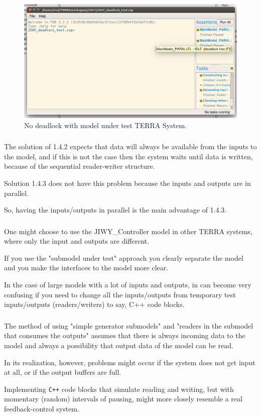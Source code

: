 \documentclass[a4paper,twoside,11pt]{article}
\newcommand{\cpp}{{\tt C++} }
\begin{document}
\begin{figure}
	\centering
	\includegraphics[width=\textwidth]{./images/4-4_fdr.png}
	\caption{No deadlock with model under test TERRA System.}
	\label{fig:4_4_fdr}
\end{figure}

\subsubsection{}
The solution of 1.4.2 expects that data will always be available from the inputs 
to the model, and if this is not the case then the system waits until data is written, 
because of the sequential reader-writer structure.

Solution 1.4.3 does not have this problem because the inputs and outputs are in parallel.

So, having the inputs/outputs in parallel is the main advantage of 1.4.3.

\subsubsection{}
One might choose to use the JIWY\_Controller model in other TERRA systems, where only the input and outputs are different.

If you use the "submodel under test" approach you clearly separate the model and you make the interfaces to the model more clear.

In the case of large models with a lot of inputs and outputs, in can become very confusing if you need to change all the inputs/outputs from temporary test inputs/outputs (readers/writers) to say, C++ code blocks.

\subsubsection{}
The method of using "simple generator submodels" and "readers in the submodel 
that consumes the outputs" assumes that there is always incoming data to the model and always a possibility that output data of the model can be read.

In its realization, however, problems might occur if the system does not get input at all, or if the output buffers are full.

Implementing \cpp code blocks that simulate reading and writing,
but with momentary (random) intervals of pausing, might more closely resemble a real feedback-control system.
\end{document}
